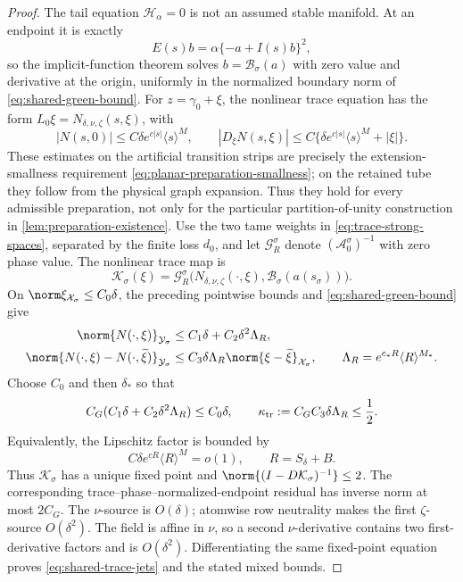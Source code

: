 \begin{proof}
The tail equation \(\mathscr H_\alpha=0\) is not an assumed stable
manifold.  At an endpoint it is exactly
\begin{equation}
 E(s)b=\alpha\{-a+I(s)b\}^2,                           \label{eq:shared-tail-level}
\end{equation}
so the implicit-function theorem solves \(b=\mathcal B_\sigma(a)\) with
zero value and derivative at the origin, uniformly in the normalized
boundary norm of \cref{eq:shared-green-bound}.  For
 \(z=\gamma_0+\xi\), the nonlinear trace equation has the form
 \(L_0\xi=N_{\delta,\nu,\zeta}(s,\xi)\), with
\[
 |N(s,0)|\le C\delta e^{c|s|}\langle s\rangle^M,
 \qquad
 |D_\xi N(s,\xi)|\le
 C\{\delta e^{c|s|}\langle s\rangle^M+|\xi|\}.
\]
These estimates on the artificial transition strips are precisely the
extension-smallness requirement
\cref{eq:planar-preparation-smallness}; on the retained tube they follow from
the physical graph expansion.  Thus they hold for every admissible
preparation, not only for the particular partition-of-unity construction in
\cref{lem:preparation-existence}.
Use the two tame weights in \cref{eq:trace-strong-spaces}, separated by the
finite loss \(d_0\), and let \(\mathcal G_R^\sigma\) denote
\((\mathscr A_0^\sigma)^{-1}\) with zero phase value.  The nonlinear trace
map is
\[
 \mathcal K_\sigma(\xi)
 =\mathcal G_R^\sigma
   \bigl(N_{\delta,\nu,\zeta}(\cdot,\xi),
         \mathcal B_\sigma(a(s_\sigma))\bigr).
\]
On \(\norm\xi_{\mathcal X_\sigma}\le C_0\delta\), the preceding pointwise
bounds and \cref{eq:shared-green-bound} give
\begin{align}
 \norm{N(\cdot,\xi)}_{\mathcal Y_\sigma}
 &\le C_1\delta+C_2\delta^2\Lambda_R,\notag\\
 \norm{N(\cdot,\xi)-N(\cdot,\widetilde\xi)}_{\mathcal Y_\sigma}
 &\le C_3\delta\Lambda_R
       \norm{\xi-\widetilde\xi}_{\mathcal X_\sigma},
 \qquad
 \Lambda_R=e^{c_*R}\langle R\rangle^{M_*}.           \label{eq:shared-trace-source}
\end{align}
Choose \(C_0\) and then \(\delta_*\) so that
\begin{equation}
 C_G(C_1\delta+C_2\delta^2\Lambda_R)\le C_0\delta,
 \qquad
 \kappa_{\rm tr}:=C_GC_3\delta\Lambda_R\le\frac12.  \label{eq:shared-trace-contraction}
\end{equation}
Equivalently, the Lipschitz factor is bounded by
\begin{equation}
 C\delta e^{cR}\langle R\rangle^M=o(1),
 \qquad R=S_\delta+B.                                 \label{eq:shared-trace-smallness}
\end{equation}
Thus \(\mathcal K_\sigma\) has a unique fixed point and
\(\norm{(I-D\mathcal K_\sigma)^{-1}}\le2\).  The corresponding
trace--phase--normalized-endpoint residual has inverse norm at most
\(2C_G\).  The \(\nu\)-source is \(O(\delta)\); atomwise row neutrality
makes the first \(\zeta\)-source \(O(\delta^2)\).
The field is affine in \(\nu\), so a second \(\nu\)-derivative contains two
first-derivative factors and is \(O(\delta^2)\).  Differentiating the same
fixed-point equation proves
\cref{eq:shared-trace-jets} and the stated mixed bounds.


\end{proof}
